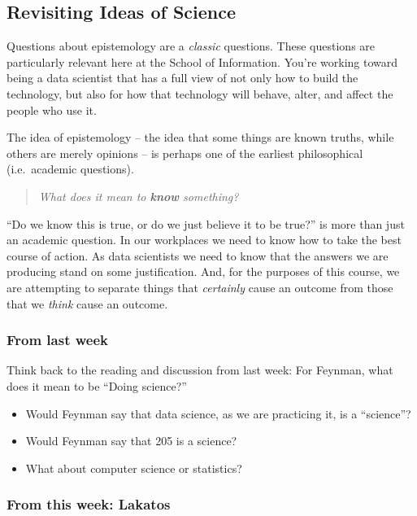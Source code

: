 \documentclass[
]{article}
\providecommand{\tightlist}{%
  \setlength{\itemsep}{0pt}\setlength{\parskip}{0pt}}
\begin{document}
\hypertarget{revisiting-ideas-of-science}{%
\subsection{Revisiting Ideas of Science}\label{revisiting-ideas-of-science}}

Questions about epistemology are a \emph{classic} questions. These questions are particularly relevant here at the School of Information. You're working toward being a data scientist that has a full view of not only how to build the technology, but also for how that technology will behave, alter, and affect the people who use it.

The idea of epistemology -- the idea that some things are known truths, while others are merely opinions -- is perhaps one of the earliest philosophical (i.e.~academic questions).

\begin{quote}
\emph{What does it mean to \textbf{know} something?}
\end{quote}

``Do we know this is true, or do we just believe it to be true?'' is more than just an academic question. In our workplaces we need to know how to take the best course of action. As data scientists we need to know that the answers we are producing stand on some justification. And, for the purposes of this course, we are attempting to separate things that \emph{certainly} cause an outcome from those that we \emph{think} cause an outcome.

\hypertarget{from-last-week}{%
\subsubsection{From last week}\label{from-last-week}}

Think back to the reading and discussion from last week: For Feynman, what does it mean to be ``Doing science?''

\begin{itemize}
\tightlist
\item
  Would Feynman say that data science, as we are practicing it, is a ``science''?
\item
  Would Feynman say that 205 is a science?
\item
  What about computer science or statistics?
\end{itemize}

\hypertarget{from-this-week-lakatos}{%
\subsubsection{From this week: Lakatos}\label{from-this-week-lakatos}}
\end{document}
